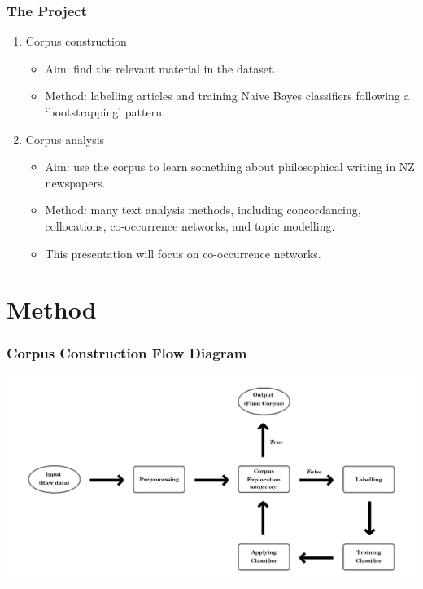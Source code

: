 \documentclass[10pt, compress]{beamer}
\begin{document}
\begin{frame}
	\frametitle{The Project}

	\pause

  \begin{enumerate}[<+- | alert@+>]
		\item Corpus construction
		\begin{itemize}
			\item Aim: find the relevant material in the dataset.
			\item Method: labelling articles and training Naive Bayes classifiers following a `bootstrapping' pattern.
		\end{itemize}
		\item Corpus analysis
		\begin{itemize}
			\item Aim: use the corpus to learn something about philosophical writing in NZ newspapers.
			\item Method: many text analysis methods, including concordancing, collocations, co-occurrence networks, and topic modelling.
			\item This presentation will focus on co-occurrence networks.
		\end{itemize}
	\end{enumerate}

\end{frame}

\section{Method}

\begin{frame}
	\frametitle{Corpus Construction Flow Diagram}
	\begin{center}
	\includegraphics[width=\textwidth]{images/flow_diagram.png}
	\end{center}
\end{frame}
\end{document}
